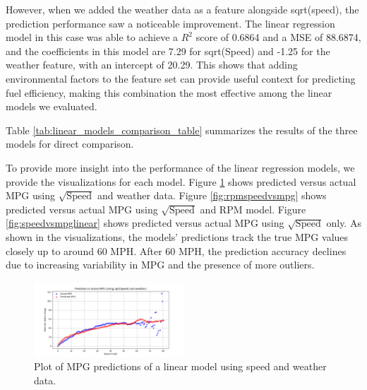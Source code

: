 \documentclass[letterpaper]{article}
\begin{document}
However, when we added the weather data as a feature alongside sqrt(speed), 
the prediction performance saw a noticeable improvement. The linear 
regression model in this case was able to achieve a $R^2$ score of 0.6864 
and a MSE of 88.6874, and the coefficients in this model are 7.29 for 
sqrt(Speed) and -1.25 for the weather feature, with an intercept of 20.29. 
This shows that adding environmental factors to the feature set can 
provide useful context for predicting fuel efficiency, making this 
combination the most effective among the linear models we evaluated.

Table \ref{tab:linear_models_comparison_table} summarizes the results of the 
three models for direct comparison.

\begin{table}
    \centering
    \caption{Comparison of Linear Regression Models}
    \label{tab:linear_models_comparison_table}
\end{table}

To provide more insight into the performance of the linear regression 
models, we provide the visualizations for each model. Figure 
\ref{fig:weatherspeedvsmpg} shows  predicted versus actual MPG using 
$\sqrt{\mathrm{Speed}}$ and weather data. Figure \ref{fig:rpmspeedvsmpg}
shows predicted versus actual MPG using $\sqrt{\mathrm{Speed}}$ and RPM 
model. Figure \ref{fig:speedvsmpglinear} shows predicted versus actual MPG 
using $\sqrt{\mathrm{Speed}}$ only. As shown in the visualizations, the 
models' predictions track the true MPG values closely up to around 60 MPH. 
After 60 MPH, the prediction accuracy declines due to increasing 
variability in MPG and the presence of more outliers.

\begin{figure}[htbp]
    \centering
    \includegraphics[width=0.5\textwidth]{figures/sqrt_speed_weather_vs_mpg_multiregression_model.png}
    \caption{Plot of MPG predictions of a linear model using speed and weather data.}
    \label{fig:weatherspeedvsmpg}
\end{figure}
\end{document}
